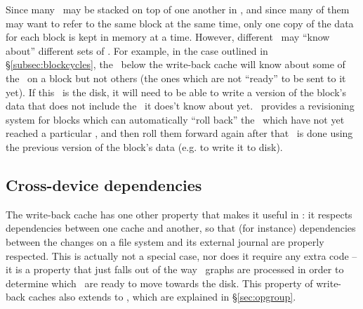 Since many \modules\ may be stacked on top of one another in \Kudos, and since
many of them may want to refer to the same block at the same time, only one copy
of the data for each block is kept in memory at a time. However, different
\modules\ may ``know about'' different sets of \chdescs. For example, in the
case outlined in \S\ref{subsec:blockcycles}, the \module\ below the write-back
cache will know about some of the \chdescs\ on a block but not others (the ones
which are not ``ready'' to be sent to it yet). If this \module\ is the disk, it
will need to be able to write a version of the block's data that does not
include the \chdescs\ it does't know about yet. \Kudos\ provides a revisioning
system for blocks which can automatically ``roll back'' the \chdescs\ which have
not yet reached a particular \module, and then roll them forward again after
that \module\ is done using the previous version of the block's data (e.g. to
write it to disk).

\subsection{Cross-device dependencies}

The write-back cache has one other property that makes it useful in \Kudos: it
respects dependencies between one cache and another, so that (for instance)
dependencies between the changes on a file system and its external journal are
properly respected. This is actually not a special case, nor does it require any
extra code -- it is a property that just falls out of the way \chdesc\ graphs
are processed in order to determine which \chdescs\ are ready to move towards
the disk. This property of write-back caches also extends to \opgroups, which
are explained in \S\ref{sec:opgroup}.
